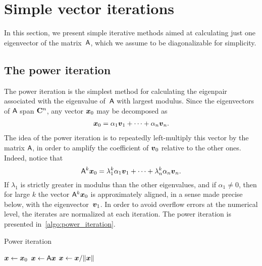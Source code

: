 \section{Simple vector iterations}
\label{sec:simple_vector_iterations}

In this section,
we present simple iterative methods aimed at calculating just one eigenvector of the matrix~$\mathsf A$,
which we assume to be diagonalizable for simplicity.

\subsection{The power iteration}
The power iteration is the simplest method for calculating the eigenpair associated with the eigenvalue of~$\mathsf A$ with largest modulus.
Since the eigenvectors of $\mathsf A$ span $\mathbf C^n$,
any vector $\mathbf{\boldsymbol{x}}_0$ may be decomposed as
\begin{align}
    \label{eq:eigen_decomposition_x0}
    \mathbf{\boldsymbol{x}}_0 = \alpha_1 \mathbf{\boldsymbol{v}}_1 + \dotsb + \alpha_n \mathbf{\boldsymbol{v}}_n.
\end{align}
The idea of the power iteration is to repeatedly left-multiply this vector by the matrix $\mathsf A$,
in order to amplify the coefficient of $\mathbf{\boldsymbol{v}}_0$ relative to the other ones.
Indeed, notice that
\[
    \mathsf A^k \mathbf{\boldsymbol{x}}_0 = \lambda_1^k \alpha_1 \mathbf{\boldsymbol{v}}_1 + \dotsb + \lambda_n^k \alpha_n \mathbf{\boldsymbol{v}}_n.
\]
If $\lambda_1$ is strictly greater in modulus than the other eigenvalues,
and if $\alpha_1 \neq 0$,
then for large $k$ the vector $\mathsf A^k \mathbf{\boldsymbol{x}}_0$ is approximately aligned,
in a sense made precise below,
with the eigenvector~$\mathbf{\boldsymbol{v}}_1$.
In order to avoid overflow errors at the numerical level,
the iterates are normalized at each iteration.
The power iteration is presented in~\cref{algo:power_iteration}.
\begin{algorithm}
\caption{Power iteration}%
\label{algo:power_iteration}%
\begin{algorithmic}
\State $\mathbf{\boldsymbol{x}} \gets \mathbf{\boldsymbol{x}}_0$
    \State $\mathbf{\boldsymbol{x}} \gets \mathsf A \mathbf{\boldsymbol{x}}$
    \State $\mathbf{\boldsymbol{x}} \gets \mathbf{\boldsymbol{x}} / \lVert\mathbf{\boldsymbol{x}}\rVert$
\EndFor
\end{algorithmic}
\end{algorithm}

